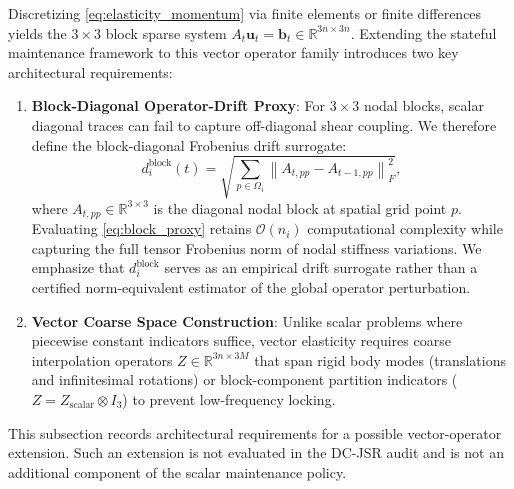 Discretizing \eqref{eq:elasticity_momentum} via finite elements or finite differences yields the $3 \times 3$ block sparse system $A_t \boldsymbol{u}_t = \boldsymbol{b}_t \in \mathbb{R}^{3n \times 3n}$. Extending the stateful maintenance framework to this vector operator family introduces two key architectural requirements:
\begin{enumerate}
    \item \textbf{Block-Diagonal Operator-Drift Proxy}: For $3 \times 3$ nodal blocks, scalar diagonal traces can fail to capture off-diagonal shear coupling. We therefore define the block-diagonal Frobenius drift surrogate:
    \begin{equation}
    d_i^{\text{block}}(t) = \sqrt{\sum_{p \in \Omega_i} \left\| A_{t, pp} - A_{t-1, pp} \right\|_F^2},
    \label{eq:block_proxy}
    \end{equation}
    where $A_{t, pp} \in \mathbb{R}^{3 \times 3}$ is the diagonal nodal block at spatial grid point $p$. Evaluating \eqref{eq:block_proxy} retains $\mathcal{O}(n_i)$ computational complexity while capturing the full tensor Frobenius norm of nodal stiffness variations. We emphasize that $d_i^{\text{block}}$ serves as an empirical drift surrogate rather than a certified norm-equivalent estimator of the global operator perturbation.
    \item \textbf{Vector Coarse Space Construction}: Unlike scalar problems where piecewise constant indicators suffice, vector elasticity requires coarse interpolation operators $Z \in \mathbb{R}^{3n \times 3M}$ that span rigid body modes (translations and infinitesimal rotations) or block-component partition indicators ($Z = Z_{\text{scalar}} \otimes I_3$) to prevent low-frequency locking.
\end{enumerate}
This subsection records architectural requirements for a possible vector-operator extension. Such an extension is not evaluated in the DC-JSR audit and is not an additional component of the scalar maintenance policy.

